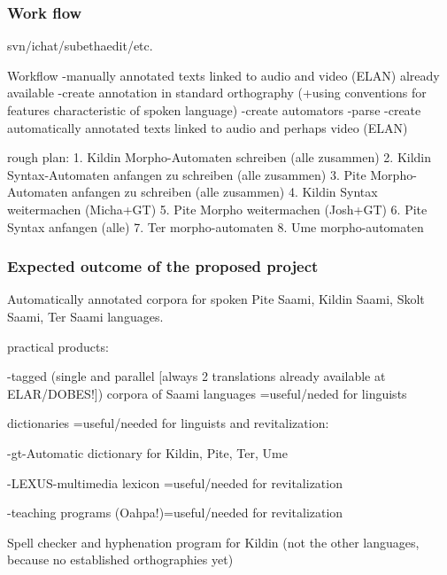 \documentclass[a4paper,12pt]{article}
\begin{document}
\subsubsection{Work flow}
svn/ichat/subethaedit/etc.

Workflow
-manually annotated texts linked to audio and video (ELAN) already available
-create annotation in standard orthography (+using conventions for features characteristic of spoken language)
-create automators
-parse
-create automatically annotated texts linked to audio and perhaps video (ELAN)

rough plan:
1. Kildin Morpho-Automaten schreiben (alle zusammen)
2. Kildin Syntax-Automaten anfangen zu schreiben (alle zusammen)
3. Pite Morpho-Automaten anfangen zu schreiben (alle zusammen)
4. Kildin Syntax weitermachen (Micha+GT)
5. Pite Morpho weitermachen (Josh+GT)
6. Pite Syntax anfangen (alle)
7. Ter morpho-automaten
8. Ume morpho-automaten


\subsubsection{Expected outcome of the proposed project}
Automatically annotated corpora for spoken Pite Saami, Kildin Saami, Skolt Saami, Ter Saami languages.

practical products:

-tagged (single and parallel [always 2 translations already available at ELAR/DOBES!]) corpora of Saami languages =useful/neded for linguists

dictionaries =useful/needed for linguists and revitalization:

-gt-Automatic dictionary for Kildin, Pite, Ter, Ume

-LEXUS-multimedia lexicon =useful/needed for revitalization

-teaching programs (Oahpa!)=useful/needed for revitalization

Spell checker and hyphenation program for Kildin (not the other languages, because no established orthographies yet)
\end{document}
